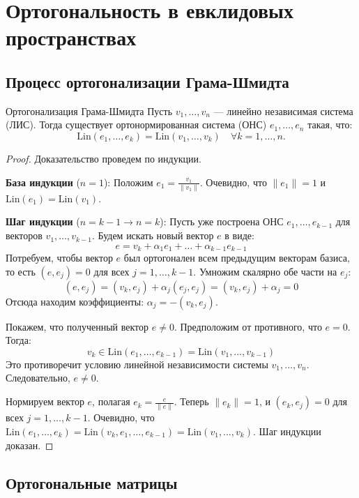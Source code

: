 
\section{Ортогональность в евклидовых пространствах}

\subsection{Процесс ортогонализации Грама-Шмидта}

\begin{Theorem}{Ортогонализация Грама-Шмидта}{}
	Пусть $v_1, \dots, v_n$ — линейно независимая система (ЛИС). Тогда существует ортонормированная система (ОНС) $e_1, \dots, e_n$ такая, что:
	\[
	\mathrm{Lin}(e_1, \dots, e_k) = \mathrm{Lin}(v_1, \dots, v_k) \quad \forall k = 1, \dots, n.
	\]
\end{Theorem}

\begin{proof}
	Доказательство проведем по индукции.
	
	\textbf{База индукции} ($n = 1$): 
	Положим $e_1 = \frac{v_1}{\|v_1\|}$. Очевидно, что $\|e_1\| = 1$ и $\mathrm{Lin}(e_1) = \mathrm{Lin}(v_1)$.
	
	\textbf{Шаг индукции} ($n = k - 1 \to n = k$): 
	Пусть уже построена ОНС $e_1, \dots, e_{k-1}$ для векторов $v_1, \dots, v_{k-1}$. 
	Будем искать новый вектор $e$ в виде:
	\[
	e = v_k + \alpha_1 e_1 + \dots + \alpha_{k-1} e_{k-1}
	\]
	Потребуем, чтобы вектор $e$ был ортогонален всем предыдущим векторам базиса, то есть $(e, e_j) = 0$ для всех $j = 1, \dots, k-1$. Умножим скалярно обе части на $e_j$:
	\[
	(e, e_j) = (v_k, e_j) + \alpha_j (e_j, e_j) = (v_k, e_j) + \alpha_j = 0
	\]
	Отсюда находим коэффициенты: $\alpha_j = -(v_k, e_j)$.
	
	Покажем, что полученный вектор $e \neq 0$. Предположим от противного, что $e = 0$. Тогда:
	\[
	v_k \in \mathrm{Lin}(e_1, \dots, e_{k-1}) = \mathrm{Lin}(v_1, \dots, v_{k-1})
	\]
	Это противоречит условию линейной независимости системы $v_1, \dots, v_n$. Следовательно, $e \neq 0$.
	
	Нормируем вектор $e$, полагая $e_k = \frac{e}{\|e\|}$. Теперь $\|e_k\| = 1$, и $(e_k, e_j) = 0$ для всех $j = 1, \dots, k-1$. 
	Очевидно, что $\mathrm{Lin}(e_1, \dots, e_k) = \mathrm{Lin}(v_k, e_1, \dots, e_{k-1}) = \mathrm{Lin}(v_1, \dots, v_k)$. Шаг индукции доказан.
\end{proof}

\subsection{Ортогональные матрицы}

